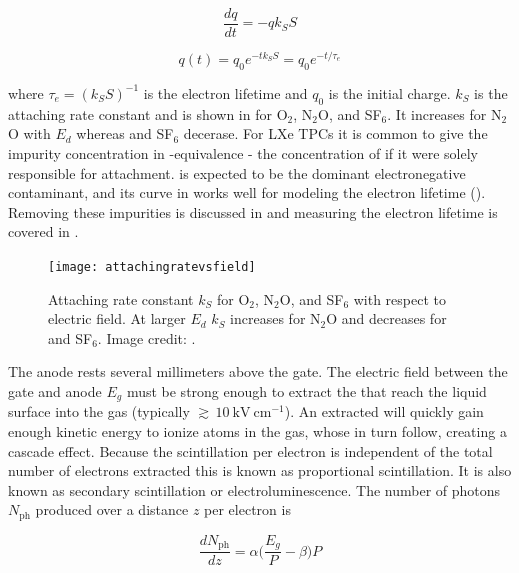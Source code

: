 \begin{equation}
\frac{dq}{dt} = -qk_{S}S
\label{eq:lifetime_diff_eq}
\end{equation}

\begin{equation}
q(t) = q_{0}e^{-tk_{S}S} = q_{0}e^{-t/\tau_{e}}
\label{eq:lifetime_equation}
\end{equation}

\noindent where $\tau_{e} = (k_{S}S)^{-1}$ is the electron lifetime and $q_0$ is the initial charge.  $k_{S}$ is the attaching rate
constant and is shown in  for O$_{2}$,
N$_{2}$O, and SF$_{6}$.  It increases for N$_{2}$O with $E_d$ whereas \otwo and SF$_{6}$
decerase.  For LXe TPCs it is common to give the impurity concentration in -equivalence - the concentration of \otwo if it were
solely responsible for \electron attachment.   is expected to be the dominant electronegative contaminant, and its curve
in  works well for modeling the electron lifetime ().  Removing these
impurities is discussed in  and measuring the electron lifetime is covered in
.

\begin{figure}
\texttt{[image: attachingratevsfield]}
\caption{Attaching rate constant $k_{S}$ for O$_{2}$, N$_{2}$O, and SF$_{6}$ with respect to electric field.  At
larger $E_d$ $k_{S}$ increases for N$_{2}$O and decreases for \otwo and SF$_{6}$.  Image credit: .}
\label{fig:attachment_rate}
\end{figure}

The anode rests several millimeters above the gate.  The electric field between the gate and anode $E_{g}$ must be strong
enough to extract the \electron that reach the liquid surface into the gas (typically ${\gtrsim}\, 10\ \mathrm{kV\ cm^{-1}}$).  An
extracted \electron will quickly gain enough kinetic energy to ionize atoms in the gas,
whose \electron in turn follow, creating a cascade effect.  Because the scintillation per electron is independent of
the total number of electrons extracted this is known as proportional scintillation.  It is also known as secondary scintillation or
electroluminescence.  The number of photons $N_{\mathrm{ph}}$ produced over a distance $z$ per electron is

\begin{equation}
\frac{dN_{\mathrm{ph}}}{dz} = \alpha \bigg( \frac{E_{g}}{P} - \beta \bigg) P
\label{eq:electronlum}
\end{equation}

